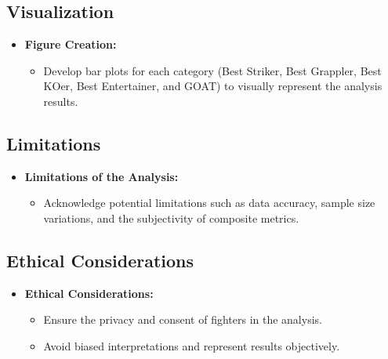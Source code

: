\documentclass[
  man,floatsintext]{apa6}
\providecommand{\tightlist}{%
  \setlength{\itemsep}{0pt}\setlength{\parskip}{0pt}}
\begin{document}
\hypertarget{visualization}{%
\subsection{Visualization}\label{visualization}}

\begin{itemize}
\tightlist
\item
  \textbf{Figure Creation:}

  \begin{itemize}
  \tightlist
  \item
    Develop bar plots for each category (Best Striker, Best Grappler, Best KOer, Best Entertainer, and GOAT) to visually represent the analysis results.
  \end{itemize}
\end{itemize}

\hypertarget{limitations}{%
\subsection{Limitations}\label{limitations}}

\begin{itemize}
\tightlist
\item
  \textbf{Limitations of the Analysis:}

  \begin{itemize}
  \tightlist
  \item
    Acknowledge potential limitations such as data accuracy, sample size variations, and the subjectivity of composite metrics.
  \end{itemize}
\end{itemize}

\hypertarget{ethical-considerations}{%
\subsection{Ethical Considerations}\label{ethical-considerations}}

\begin{itemize}
\tightlist
\item
  \textbf{Ethical Considerations:}

  \begin{itemize}
  \tightlist
  \item
    Ensure the privacy and consent of fighters in the analysis.
  \item
    Avoid biased interpretations and represent results objectively.
  \end{itemize}
\end{itemize}
\end{document}

